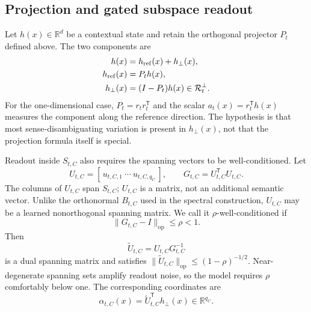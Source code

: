 \documentclass[
  aps,
  reprint,
  superscriptaddress,
  floatfix,
  nofootinbib,
  longbibliography
]{revtex4-2}
\newcommand{\R}{\mathbb{R}}
\newcommand{\T}{^{\mathsf{T}}}
\newcommand{\opnorm}[1]{\lVert #1 \rVert_{\mathrm{op}}}
\begin{document}
\subsection{Projection and gated subspace readout}
\label{sec:gated}

Let $h(x)\in\R^d$ be a contextual state and retain the orthogonal projector
$P_t$ defined above. The two components are
%
\begin{align}
\label{eq:reference-decomp}
h(x)&=h_{\rm ref}(x)+h_\perp(x),\\
h_{\rm ref}(x)&=P_t h(x),\nonumber\\
h_\perp(x)&=(I-P_t)h(x)\in\mathcal R_t^\perp.\nonumber
\end{align}
%
For the one-dimensional case, $P_t=r_t r_t\T$ and the scalar
$a_t(x)=r_t\T h(x)$ measures the component along the reference direction.
The hypothesis is that most sense-disambiguating variation is present in
$h_\perp(x)$, not that the projection formula itself is special.

Readout inside $S_{t,C}$ also requires the spanning vectors to be
well-conditioned. Let
%
\begin{equation}
U_{t,C}=[\,u_{t,C,1}\ \cdots\ u_{t,C,q_C}\,],
\qquad
G_{t,C}=U_{t,C}\T U_{t,C}.
\end{equation}
%
The columns of $U_{t,C}$ span $S_{t,C}$; $U_{t,C}$ is a matrix, not an
additional semantic vector. Unlike the orthonormal $B_{t,C}$ used in the
spectral construction, $U_{t,C}$ may be a learned nonorthogonal spanning
matrix. We call it $\rho$-well-conditioned if
%
\begin{equation}
\label{eq:rho-stable}
\opnorm{G_{t,C}-I}\le\rho<1.
\end{equation}
%
Then
%
\begin{equation}
\label{eq:dual-spanning}
\widetilde U_{t,C}=U_{t,C}G_{t,C}^{-1}
\end{equation}
%
is a dual spanning matrix and satisfies
$\opnorm{\widetilde U_{t,C}}\le(1-\rho)^{-1/2}$. Near-degenerate spanning
sets amplify readout noise, so the model requires $\rho$ comfortably below
one. The corresponding coordinates are
%
\begin{equation}
\label{eq:alpha}
\alpha_{t,C}(x)=\widetilde U_{t,C}\T h_\perp(x)
\in\R^{q_C}.
\end{equation}
%
\end{document}
